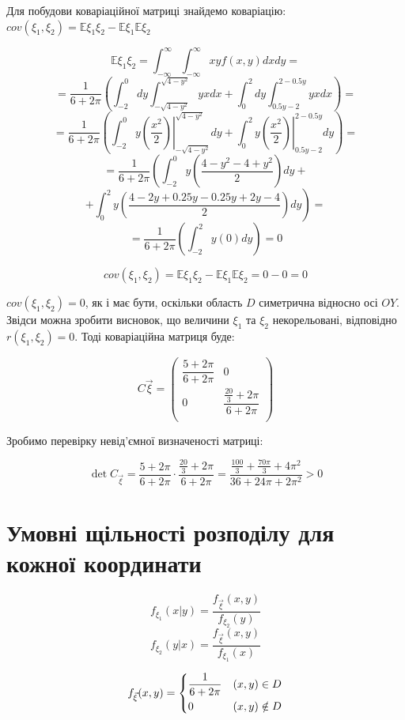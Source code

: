 \documentclass[14pt, a4paper, ukrainian]{extreport}
\begin{document}
	Для побудови коваріаційної матриці знайдемо коваріацію:\\ $cov(\xi_1, \xi_2) = \mathbb{E}\xi_1\xi_2 - \mathbb{E}\xi_1\mathbb{E}\xi_2$
 		
 	$$\mathbb{E}\xi_1\xi_2 = \int_{-\infty}^{\infty}\int_{-\infty}^{\infty}xyf(x, y)dxdy = $$
 	$$ =  \frac{1}{6+2\pi} \left(\int_{-2}^{0}dy\int_{-\sqrt{4-y^2}}^{\sqrt{4-y^2}}yxdx + \int_{0}^{2}dy\int_{0.5y-2}^{2-0.5y}yxdx\right) = 
 	$$
 	$$ = \frac{1}{6+2\pi} \left(\int_{-2}^{0}y\left.\left(\frac{x^2}{2}\right)\right|_{-\sqrt{4-y^2}}^{\sqrt{4-y^2}}dy+ \int_{0}^{2}y\left.\left(\frac{x^2}{2}\right)\right|_{0.5y-2}^{2-0.5y}dy \right)= 
 	$$
 	$$ = \frac{1}{6+2\pi} \left(\int_{-2}^{0}y\left(\frac{4-y^2 - 4 + y^2}{2}\right)dy \right.+ 
 	$$
 	$$ + \left.\int_{0}^{2}y\left(\frac{4 - 2y + 0.25y - 0.25y + 2y - 4}{2}\right)dy\right) = 
 	$$
 	$$ =\frac{1}{6+2\pi}\left(\int_{-2}^{2}y(0)dy\right) = 0$$
 	
 	$$cov(\xi_1, \xi_2) = \mathbb{E}\xi_1\xi_2 - \mathbb{E}\xi_1\mathbb{E}\xi_2 = 0 - 0 = 0$$
 		
 	$cov(\xi_1, \xi_2) = 0$, як і має бути, оскільки область $D$ симетрична відносно осі $OY$. Звідси можна зробити висновок, що величини $\xi_1$ та $\xi_2$ некорельовані, відповідно $r(\xi_1, \xi_2) = 0$. Тоді коваріаційна матриця буде:
 	
 	$$C{\vec\xi} = \left(  
 	\begin{matrix}
 		\dfrac{5+2\pi}{6+2\pi} & 0\\
 		0 & \dfrac{\frac{20}{3} + 2\pi}{6 + 2\pi}\\
 	\end{matrix}\right)
 	$$
 	
 	Зробимо перевірку невід'ємної визначеності матриці: 
 	
 	$$\det{C_{\vec\xi}}  = \frac{5 + 2\pi}{6+2\pi} \cdot \frac{\frac{20}{3} + 2\pi}{6+2\pi} = \frac{\frac{100}{3} + \frac{70\pi}{3} + 4\pi^2}{36 + 24\pi + 2\pi^2} > 0$$
 	 	
 	\section{Умовні щільності розподілу для кожної координати}
 	
 	$$f_{\xi_1}(x|y) = \dfrac{f_{\vec \xi}(x, y)}{f_{\xi_2}(y)} $$
 	$$f_{\xi_2}(y|x) = \dfrac{f_{\vec \xi}(x, y)}{f_{\xi_1}(x)} $$
 	
 	$$f_{\vec \xi}(x, y) = 
 	\begin{dcases}
 		\frac{1}{6+2\pi} & (x, y) \in D\\
 		0 & (x, y) \notin D\\
 	\end{dcases}
 	$$
 	
\end{document}
